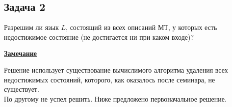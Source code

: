 \documentclass[a4paper,12pt]{article} %
\begin{document}
\subsection*{Задача 2}
Разрешим ли язык $L$, состоящий из всех описаний МТ, у которых есть недостижимое состояние (не достигается ни при каком входе)?\\

\begin{center}
 \textbf{\underline{Замечание}}
\end{center}

Решение использует существование вычислимого алгоритма удаления всех недостижимых состояний, которого, как оказалось после семинара, не существует.\\ По другому не успел решить. Ниже предложено первоначальное решение.\\
\end{document}
